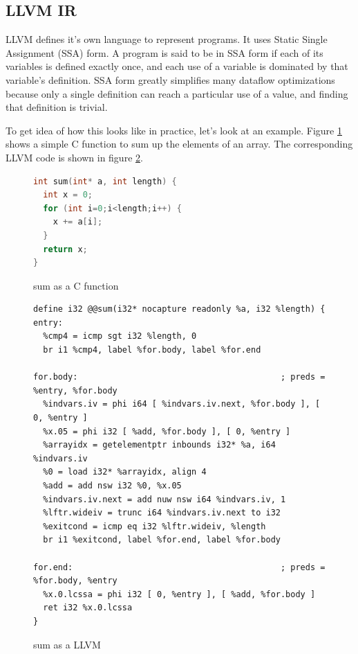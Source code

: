 \documentclass[a4paper,bibliography=totocnumbered,parskip,headsepline]{scrbook}
\begin{document}
\subsection{LLVM IR}
LLVM defines it's own language to represent programs.
It uses Static Single Assignment (SSA) form.\cite{alpern1988detecting,rosen1988global}
A program is said to be in SSA form if each of its variables is defined exactly once, and each use of a variable is dominated by that variable’s definition.
SSA form greatly simplifies many dataflow optimizations because only a single definition can reach a particular use of a value, and finding that definition is trivial.

To get idea of how this looks like in practice, let's look at an example.
Figure \ref{fig:sumc} shows a simple C function to sum up the elements of an array. The corresponding LLVM code is shown in figure \ref{fig:sumll}.

\begin{figure}
\begin{lstlisting}[language=C]
int sum(int* a, int length) {
  int x = 0;
  for (int i=0;i<length;i++) {
    x += a[i];
  }
  return x;
}
\end{lstlisting}
\caption{sum as a C function}
\label{fig:sumc}
\end{figure}

\begin{figure}
\begin{lstlisting}
define i32 @@sum(i32* nocapture readonly %a, i32 %length) {
entry:
  %cmp4 = icmp sgt i32 %length, 0
  br i1 %cmp4, label %for.body, label %for.end

for.body:                                         ; preds = %entry, %for.body
  %indvars.iv = phi i64 [ %indvars.iv.next, %for.body ], [ 0, %entry ]
  %x.05 = phi i32 [ %add, %for.body ], [ 0, %entry ]
  %arrayidx = getelementptr inbounds i32* %a, i64 %indvars.iv
  %0 = load i32* %arrayidx, align 4
  %add = add nsw i32 %0, %x.05
  %indvars.iv.next = add nuw nsw i64 %indvars.iv, 1
  %lftr.wideiv = trunc i64 %indvars.iv.next to i32
  %exitcond = icmp eq i32 %lftr.wideiv, %length
  br i1 %exitcond, label %for.end, label %for.body

for.end:                                          ; preds = %for.body, %entry
  %x.0.lcssa = phi i32 [ 0, %entry ], [ %add, %for.body ]
  ret i32 %x.0.lcssa
}
\end{lstlisting}
\caption{sum as a LLVM}
\label{fig:sumll}
\end{figure}
\end{document}
